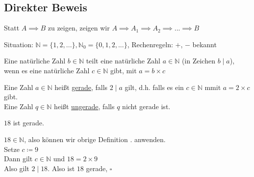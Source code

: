 \documentclass[a4paper]{article}
\begin{document}
\subsection{Direkter Beweis}
Statt $A \implies B$ zu zeigen, zeigen wir $A \implies A_1 \implies A_2 \implies ... \implies B$\par
Situation: $\mathbb{N} = \{1, 2, ... \}, \mathbb{N}_0 = \{0, 1, 2, ... \}$, Rechenregeln: $+$, $-$ bekannt
\begin{subdefinitionbox}
	Eine natürliche Zahl $b \in \mathbb{N}$ teilt eine natürliche Zahl $a \in \mathbb{N}$ (in Zeichen $b \mid a$), wenn es eine natürliche Zahl $c \in \mathbb{N}$ gibt, mit $a = b \times c$
\end{subdefinitionbox}
\begin{subdefinitionbox}
	\xdef\defgeradezahl{\thesubsection.\subdefinitionnumber}
	Eine Zahl $a \in \mathbb{N}$ heißt \underline{gerade}, falls $2\mid a$ gilt, d.h. falls es ein $c \in \mathbb{N}$ mmit $a = 2 \times c$ gibt.\\
	Eine Zahl $q \in \mathbb{N}$ heißt \underline{ungerade}, falls $q$ nicht gerade ist.
\end{subdefinitionbox}
\begin{subconjecturebox}
	$18$ ist gerade.
	\begin{subproofbox}
		$18 \in \mathbb{N}$, also können wir obrige Definition \defgeradezahl{} anwenden.\\
		Setze $c \coloneqq 9$\\
		Dann gilt $c \in \mathbb{N}$ und $18 = 2 \times 9$\\
		Also gilt $2 \mid 18$. Also ist $18$ gerade, $\square$
	\end{subproofbox}
\end{subconjecturebox}
\end{document}
